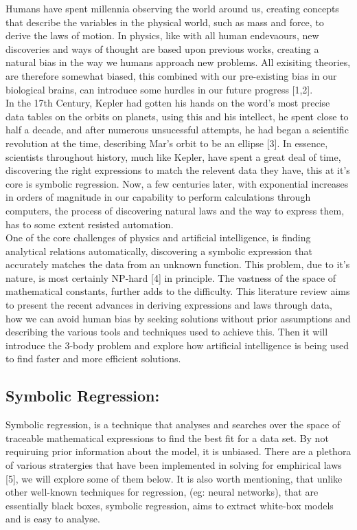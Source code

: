 \documentclass{article}
\begin{document}
Humans have spent millennia observing the world around us, creating concepts that describe the variables in the physical world, such as mass and force, to derive the laws of motion. In physics, like with all human endevaours, new discoveries and ways of thought are based upon previous works, creating a natural bias in the way we humans approach new problems. All exisiting theories, are therefore somewhat biased, this combined with our pre-existing bias in our biological brains, can introduce some hurdles in our future progress [1,2]. \\

In the 17th Century, Kepler had gotten his hands on the word's most precise data tables on the orbits on planets, using this and his intellect, he spent close to half a decade, and after numerous unsucessful attempts, he had began a scientific revolution at the time, describing Mar's orbit to be an ellipse [3]. In essence, scientists throughout history, much like Kepler, have spent a great deal of time, discovering the right expressions to match the relevent data they have, this at it's core is symbolic regression. Now, a few centuries later, with exponential increases in orders of magnitude in our capability to perform calculations through computers, the process of discovering natural laws and the way to express them, has to some extent resisted automation. \\

One of the core challenges of physics and artificial intelligence, is finding analytical relations automatically, discovering a symbolic expression that accurately matches the data from an unknown function. This problem, due to it's nature, is most certainly NP-hard [4] in principle. The vastness of the space of mathematical constants, further adds to the difficulty. This literature review aims to present the recent advances in deriving expressions and laws through data, how we can avoid human bias by seeking solutions without prior assumptions and describing the various tools and techniques used to achieve this. Then it will introduce the 3-body problem and explore how artificial intelligence is being used to find faster and more efficient solutions.\\ 

\subsection{Symbolic Regression: }

Symbolic regression, is a technique that analyses and searches over the space of traceable mathematical expressions to find the best fit for a data set. By not requiruing prior information about the model, it is unbiased. There are a plethora of various stratergies that have been implemented in solving for emphirical laws [5], we will explore some of them below. It is also worth mentioning, that unlike other well-known techniques for regression, (eg: neural networks), that are essentially black boxes, symbolic regression, aims to extract white-box models and is easy to analyse.\\
\end{document}
